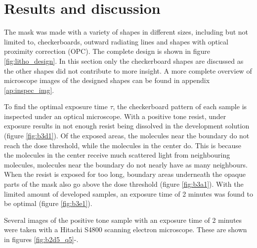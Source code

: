 \section*{Results and discussion}
The mask was made with a variety of shapes in different sizes, including but not limited to, checkerboards, outward radiating lines and shapes with optical proximity correction (OPC). The complete design is shown in figure \ref{fig:litho_design}. In this section only the checkerboard shapes are discussed as the other shapes did not contribute to more insight. A more complete overview of microscope images of the designed shapes can be found in appendix \ref{ap:inspec_img}.

To find the optimal exposure time $\tau$, the checkerboard pattern of each sample is inspected under an optical microscope. With a positive tone resist, under exposure results in not enough resist being dissolved in the development solution (figure \ref{fig:b3d1}). Of the exposed areas, the molecules near the boundary do not reach the dose threshold, while the molecules in the center do. This is because the molecules in the center receive much scattered light from neighbouring molecules, molecules near the boundary do not nearly have as many neighbours. When the resist is exposed for too long, boundary areas underneath the opaque parts of the mask also go above the dose threshold (figure \ref{fig:b3a1}). With the limited amount of developed samples, an exposure time of 2 minutes was found to be optimal (figure \ref{fig:b3e1}). 

Several images of the positive tone sample with an exposure time of 2 minutes were taken with a Hitachi S4800 scanning electron microscope. These are shown in figures \ref{fig:b2d5_q5}-.

